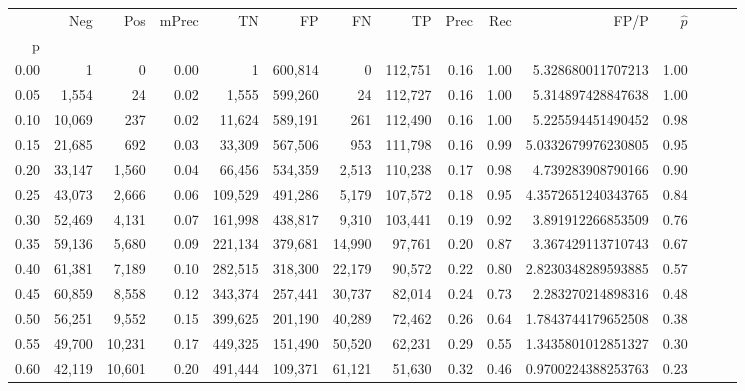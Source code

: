 \begin{tabular}{rrrrrrrrrrrrrrr}
\toprule
{} &     Neg &     Pos & mPrec &       TN &       FP &       FN &       TP &  Prec &   Rec &                   FP/P & $\hat{p}$ \\
p    &         &         &       &          &          &          &          &       &       &                        &           \\
\midrule
0.00 &       1 &       0 &  0.00 &        1 &  600,814 &        0 &  112,751 &  0.16 &  1.00 &      5.328680011707213 &      1.00 \\
0.05 &   1,554 &      24 &  0.02 &    1,555 &  599,260 &       24 &  112,727 &  0.16 &  1.00 &      5.314897428847638 &      1.00 \\
0.10 &  10,069 &     237 &  0.02 &   11,624 &  589,191 &      261 &  112,490 &  0.16 &  1.00 &      5.225594451490452 &      0.98 \\
0.15 &  21,685 &     692 &  0.03 &   33,309 &  567,506 &      953 &  111,798 &  0.16 &  0.99 &     5.0332679976230805 &      0.95 \\
0.20 &  33,147 &   1,560 &  0.04 &   66,456 &  534,359 &    2,513 &  110,238 &  0.17 &  0.98 &      4.739283908790166 &      0.90 \\
0.25 &  43,073 &   2,666 &  0.06 &  109,529 &  491,286 &    5,179 &  107,572 &  0.18 &  0.95 &     4.3572651240343765 &      0.84 \\
0.30 &  52,469 &   4,131 &  0.07 &  161,998 &  438,817 &    9,310 &  103,441 &  0.19 &  0.92 &      3.891912266853509 &      0.76 \\
0.35 &  59,136 &   5,680 &  0.09 &  221,134 &  379,681 &   14,990 &   97,761 &  0.20 &  0.87 &      3.367429113710743 &      0.67 \\
0.40 &  61,381 &   7,189 &  0.10 &  282,515 &  318,300 &   22,179 &   90,572 &  0.22 &  0.80 &     2.8230348289593885 &      0.57 \\
0.45 &  60,859 &   8,558 &  0.12 &  343,374 &  257,441 &   30,737 &   82,014 &  0.24 &  0.73 &      2.283270214898316 &      0.48 \\
0.50 &  56,251 &   9,552 &  0.15 &  399,625 &  201,190 &   40,289 &   72,462 &  0.26 &  0.64 &     1.7843744179652508 &      0.38 \\
0.55 &  49,700 &  10,231 &  0.17 &  449,325 &  151,490 &   50,520 &   62,231 &  0.29 &  0.55 &     1.3435801012851327 &      0.30 \\
0.60 &  42,119 &  10,601 &  0.20 &  491,444 &  109,371 &   61,121 &   51,630 &  0.32 &  0.46 &     0.9700224388253763 &      0.23 \\

\end{tabular}
